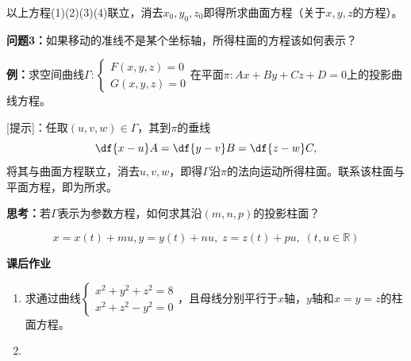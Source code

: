 以上方程(1)(2)(3)(4)联立，消去$x_0,y_0,z_0$即得所求曲面方程（关于$x,y,z$的方程）。

{\bf 问题3：}如果移动的准线不是某个坐标轴，所得柱面的方程该如何表示？

{\bf 例：}求空间曲线$\Gamma:\left\{\begin{array}{l}
F(x,y,z)=0\\ G(x,y,z)=0
\end{array}\right.$在平面$\pi:Ax+By+Cz+D=0$上的投影曲线方程。

[提示]：任取$(u,v,w)\in\Gamma$，其到$\pi$的垂线
$$\df{x-u}A=\df{y-v}B=\df{z-w}C,$$
将其与曲面方程联立，消去$u,v,w$，即得$\Gamma$沿$\pi$的法向运动所得柱面。联系该柱面与
平面方程，即为所求。

{\bf 思考：}若$\Gamma$表示为参数方程，如何求其沿$(m,n,p)$的投影柱面？

$$x=x(t)+mu,y=y(t)+nu,\;z=z(t)+pu,\;(t,u\in\mathbb{R})$$

\begin{ext}
	{\bf 课后作业}
	\begin{enumerate}
	  \item 求通过曲线$\left\{\begin{array}{l}
		x^2+y^2+z^2=8\\
		x^2+z^2-y^2=0
	  \end{array}\right.$，且母线分别平行于$x$轴，$y$轴和$x=y=z$的柱面方程。
	  \item 
	\end{enumerate}
\end{ext}

